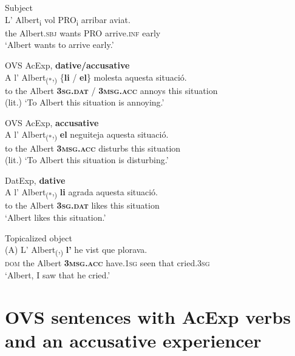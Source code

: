 \documentclass[output=paper,colorlinks,citecolor=brown,modfonts,nonflat]{langsci/langscibook}
\begin{document}
 \ex Subject\label{ex:royo:12d}\\
 \gll L’ Albert\textsubscript{i} vol PRO\textsubscript{i} arribar aviat.\\
 the Albert.\textsc{sbj} wants PRO arrive.\textsc{inf} early\\
\glt ‘Albert wants to arrive early.’

 \z
 \z



\ea%
 \label{ex:royo:13}
 \ea OVS AcExp, \textbf{dative/accusative}\label{ex:royo:13a}\\
 \gll A l’ Albert\textsubscript{(*},\textsubscript{)} \{\textbf{li} / \textbf{el}\} molesta aquesta situació.\\
 to the Albert \textbf{\textsc{3sg.dat}} / \textbf{\textsc{3msg.acc}} annoys this situation\\
\glt (lit.) ‘To Albert this situation is annoying.’

 \ex OVS AcExp, \textbf{accusative}\label{ex:royo:13b}\\
 \gll A l’ Albert\textsubscript{(*},\textsubscript{)} \textbf{el} neguiteja aquesta situació.\\
 to the Albert \textbf{\textsc{3msg.acc}} disturbs this situation \\
\glt (lit.) ‘To Albert this situation is disturbing.’

 \ex DatExp, \textbf{dative}\label{ex:royo:13c}\\
 \gll A l’ Albert\textsubscript{(*},\textsubscript{)} \textbf{li} agrada aquesta situació.\\
 to the Albert \textbf{\textsc{3sg.dat}} likes this situation\\
\glt ‘Albert likes this situation.’

 \ex Topicalized object\label{ex:royo:13d}\\
 \gll (A) L’ Albert\textsubscript{(},\textsubscript{)} \textbf{l’} he vist que plorava.\\
\textsc{dom}  the Albert \textbf{\textsc{3msg.acc}} have.\textsc{1sg} seen that cried.\textsc{3sg}\\
\glt ‘Albert, I saw that he cried.’
 \z
 \z


\section{OVS sentences with AcExp verbs and an accusative experiencer}\label{sec:royo:4}
\end{document}
